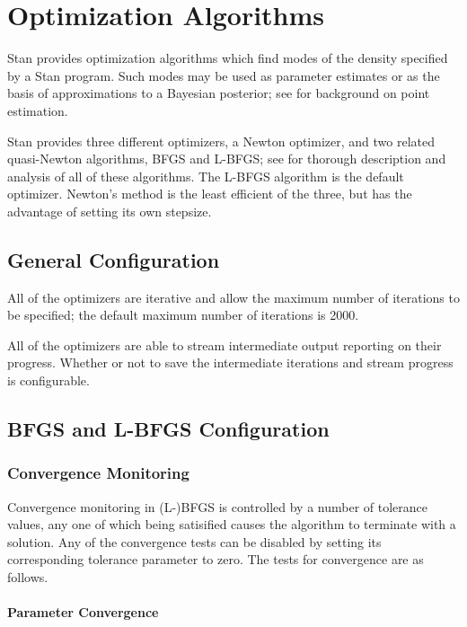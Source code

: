 \chapter{Optimization  Algorithms}%
\label{optimization-algorithms.chapter}

\noindent
Stan provides optimization algorithms which find modes of the density
specified by a Stan program. Such modes may be used as parameter
estimates or as the basis of approximations to a Bayesian posterior;
see  for background on point estimation.

Stan provides three different optimizers, a Newton optimizer, and two
related quasi-Newton algorithms, BFGS and L-BFGS; see
\citep{NocedalWright:2006} for thorough description and analysis of
all of these algorithms. The L-BFGS algorithm is the default
optimizer. Newton's method is the least efficient of the three, but
has the advantage of setting its own stepsize.

\section{General Configuration}

All of the optimizers are iterative and allow the maximum number of
iterations to be specified;  the default maximum number of iterations
is 2000.

All of the optimizers are able to stream intermediate output reporting
on their progress.  Whether or not to save the intermediate iterations
and stream progress is configurable.

\section{BFGS and L-BFGS Configuration}

\subsection{Convergence Monitoring}

Convergence monitoring in (L-)BFGS is controlled by a number of
tolerance values, any one of which being satisified causes the
algorithm to terminate with a solution. Any of the convergence tests
can be disabled by setting its corresponding tolerance parameter to
zero.  The tests for convergence are as follows.

\subsubsection{Parameter Convergence}

